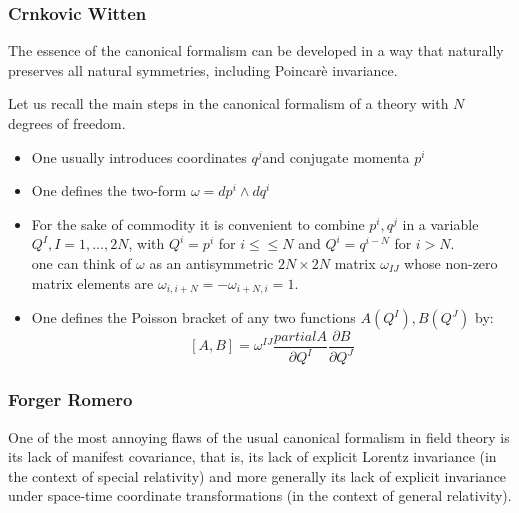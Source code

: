 \documentclass[Main]{subfiles}
\begin{document}
	
	
	
	
	
	
	
	
	
	
	
	
	
	
	
	
	
	
	
	
	
	
	
	
	
			\subsubsection{Crnkovic Witten}
			The essence of the canonical formalism can be developed in a way that naturally preserves all natural symmetries, including Poincarè invariance.
			
			Let us recall the main steps in the canonical formalism of a theory with $N$ degrees of freedom.
			\begin{itemize}
				\item  One usually introduces coordinates $q^j$and conjugate momenta $p^i$
				\item One defines the two-form $\omega = dp^i \wedge dq^i$
				\item For the sake of commodity it is convenient to combine $p^i, q^j$ in a variable $Q^I , I = 1,\ldots,2N$, with $Q^i=p^i$ for $i\leq\leq N$ and $Q^i= q^{i-N}$ for $i>N$.\\
					one can think of $\omega$ as an antisymmetric $2N \times 2N$ matrix $\omega_{I J}$ whose non-zero matrix elements are $\omega_{i, i+N} = - \omega_{i+N,i}= 1$.
				\item One defines the Poisson bracket of any two functions $A(Q^I) , B(Q^J)$ by:
					\begin{displaymath}
						\left[ A , B \right] = \omega^{I J} \frac{partial A}{\partial Q^I} \frac{\partial B}{\partial Q^J}
					\end{displaymath}
			\end{itemize}
	
		\subsubsection{Forger Romero}
			One of the most annoying flaws of the usual canonical formalism in field theory is its lack of manifest covariance, that is, its lack of explicit Lorentz invariance (in the context of special relativity) and more generally its lack of explicit invariance under space-time coordinate transformations (in the context of general relativity). 
			
\end{document}
